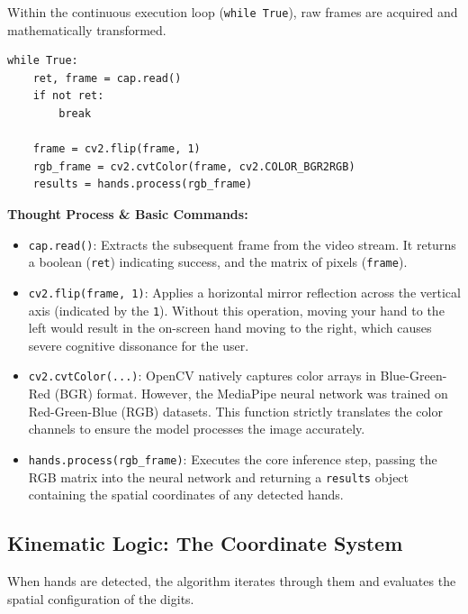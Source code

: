 Within the continuous execution loop (\texttt{while True}), raw frames are acquired and mathematically transformed.

\begin{lstlisting}
while True:
    ret, frame = cap.read()
    if not ret:
        break

    frame = cv2.flip(frame, 1)
    rgb_frame = cv2.cvtColor(frame, cv2.COLOR_BGR2RGB)
    results = hands.process(rgb_frame)
\end{lstlisting}

\textbf{Thought Process \& Basic Commands:}
\begin{itemize}
    \item \texttt{cap.read()}: Extracts the subsequent frame from the video stream. It returns a boolean (\texttt{ret}) indicating success, and the matrix of pixels (\texttt{frame}).
    \item \texttt{cv2.flip(frame, 1)}: Applies a horizontal mirror reflection across the vertical axis (indicated by the \texttt{1}). Without this operation, moving your hand to the left would result in the on-screen hand moving to the right, which causes severe cognitive dissonance for the user.
    \item \texttt{cv2.cvtColor(...)}: OpenCV natively captures color arrays in Blue-Green-Red (BGR) format. However, the MediaPipe neural network was trained on Red-Green-Blue (RGB) datasets. This function strictly translates the color channels to ensure the model processes the image accurately.
    \item \texttt{hands.process(rgb\_frame)}: Executes the core inference step, passing the RGB matrix into the neural network and returning a \texttt{results} object containing the spatial coordinates of any detected hands.
\end{itemize}

\subsection{Kinematic Logic: The Coordinate System}
\label{subsec:logic}

When hands are detected, the algorithm iterates through them and evaluates the spatial configuration of the digits.

